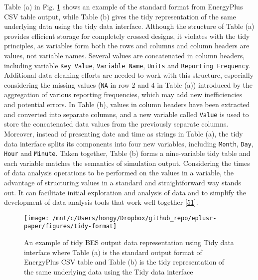 \documentclass[3p, times]{elsarticle} %
\begin{document}
Table (a) in Fig. \ref{fig:tidy-format} shows an example of the standard format
from EnergyPlus CSV table output, while Table (b) gives the tidy representation
of the same underlying data using the tidy data interface. Although the
structure of Table (a) provides efficient storage for completely crossed
designs, it violates with the tidy principles, as variables form both the rows
and columns and column headers are values, not variable names. Several values
are concatenated in column headers, including variable \texttt{Key\ Value},
\texttt{Variable\ Name}, \texttt{Units} and \texttt{Reporting\ Frequency}. Additional data cleaning
efforts are needed to work with this structure, especially considering the
missing values (\texttt{NA} in row 2 and 4 in Table (a)) introduced by the aggregation
of various reporting frequencies, which may add new inefficiencies and potential
errors. In Table (b), values in column headers have been extracted and converted
into separate columns, and a new variable called \texttt{Value} is used to store the
concatenated data values from the previously separate columns. Moreover, instead
of presenting date and time as strings in Table (a), the tidy data interface
splits its components into four new variables, including \texttt{Month}, \texttt{Day}, \texttt{Hour}
and \texttt{Minute}. Taken together, Table (b) forms a nine-variable tidy table and
each variable matches the semantics of simulation output. Considering the times
of data analysis operations to be performed on the values in a variable, the
advantage of structuring values in a standard and straightforward way stands
out. It can facilitate initial exploration and analysis of data and to simplify
the development of data analysis tools that work well together {[}\protect\hyperlink{ref-Wickham2014}{51}{]}.

\begin{figure}[!htb]
\texttt{[image: /mnt/c/Users/hongy/Dropbox/github\_repo/eplusr-paper/figures/tidy-format]} \caption{An example of tidy BES output data representation using Tidy data interface where Table (a) is the standard output format of EnergyPlus CSV table and Table (b) is the tidy representation of the same underlying data using the Tidy data interface}\label{fig:tidy-format}
\end{figure}
\end{document}
